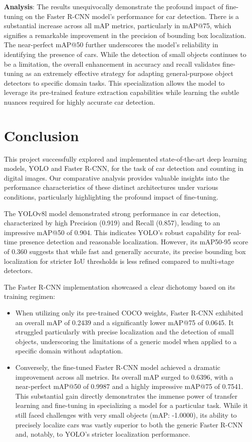 \documentclass[12pt,a4paper]{article}
\begin{document}
\textbf{Analysis}: The results unequivocally demonstrate the profound impact of fine-tuning on the Faster R-CNN model's performance for car detection. There is a substantial increase across all mAP metrics, particularly in mAP@75, which signifies a remarkable improvement in the precision of bounding box localization. The near-perfect mAP@50 further underscores the model's reliability in identifying the presence of cars. While the detection of small objects continues to be a limitation, the overall enhancement in accuracy and recall validates fine-tuning as an extremely effective strategy for adapting general-purpose object detectors to specific domain tasks. This specialization allows the model to leverage its pre-trained feature extraction capabilities while learning the subtle nuances required for highly accurate car detection.
\section{Conclusion}
\label{sec:conclusion}

This project successfully explored and implemented state-of-the-art deep learning models, YOLO and Faster R-CNN, for the task of car detection and counting in digital images. Our comparative analysis provides valuable insights into the performance characteristics of these distinct architectures under various conditions, particularly highlighting the profound impact of fine-tuning.

The YOLOv8l model demonstrated strong performance in car detection, characterized by high Precision (0.919) and Recall (0.857), leading to an impressive mAP@50 of 0.904. This indicates YOLO's robust capability for real-time presence detection and reasonable localization. However, its mAP50-95 score of 0.360 suggests that while fast and generally accurate, its precise bounding box localization for stricter IoU thresholds is less refined compared to multi-stage detectors.

The Faster R-CNN implementation showcased a clear dichotomy based on its training regimen:
\begin{itemize}
    \item When utilizing only its pre-trained COCO weights, Faster R-CNN exhibited an overall mAP of 0.2439 and a significantly lower mAP@75 of 0.0645. It struggled particularly with precise localization and the detection of small objects, underscoring the limitations of a generic model when applied to a specific domain without adaptation.
    \item Conversely, the fine-tuned Faster R-CNN model achieved a dramatic improvement across all metrics. Its overall mAP surged to 0.6396, with a near-perfect mAP@50 of 0.9987 and a highly impressive mAP@75 of 0.7541. This substantial gain directly demonstrates the immense power of transfer learning and fine-tuning in specializing a model for a particular task. While it still faced challenges with very small objects (mAP: -1.0000), its ability to precisely localize cars was vastly superior to both the generic Faster R-CNN and, notably, to YOLO's stricter localization performance.
\end{itemize}
\end{document}
